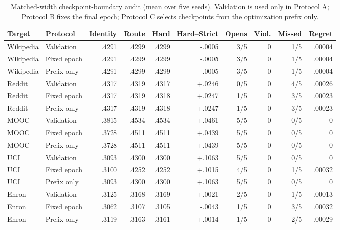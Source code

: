 \documentclass[journal]{IEEEtran}
\begin{document}
\begin{table}[t]
\centering
\caption{Matched-width checkpoint-boundary audit (mean over five seeds). Validation is used only in Protocol A; Protocol B fixes the final epoch; Protocol C selects checkpoints from the optimization prefix only.}
\label{tab:checkpoint_boundary}
\scriptsize
\setlength{\tabcolsep}{2.8pt}
\begin{tabular}{llrrrrrrrr}
\toprule
\textbf{Target} & \textbf{Protocol} & \textbf{Identity} & \textbf{Route} & \textbf{Hard} & \textbf{Hard--Strict} & \textbf{Opens} & \textbf{Viol.} & \textbf{Missed} & \textbf{Regret} \\
\midrule
Wikipedia & Validation & .4291 & .4299 & .4299 & -.0005 & 3/5 & 0 & 1/5 & .00004 \\
Wikipedia & Fixed epoch & .4291 & .4299 & .4299 & -.0005 & 3/5 & 0 & 1/5 & .00004 \\
Wikipedia & Prefix only & .4291 & .4299 & .4299 & -.0005 & 3/5 & 0 & 1/5 & .00004 \\
Reddit & Validation & .4317 & .4319 & .4317 & +.0246 & 0/5 & 0 & 4/5 & .00026 \\
Reddit & Fixed epoch & .4317 & .4319 & .4318 & +.0247 & 1/5 & 0 & 3/5 & .00023 \\
Reddit & Prefix only & .4317 & .4319 & .4318 & +.0247 & 1/5 & 0 & 3/5 & .00023 \\
MOOC & Validation & .3815 & .4534 & .4534 & +.0461 & 5/5 & 0 & 0/5 & 0 \\
MOOC & Fixed epoch & .3728 & .4511 & .4511 & +.0439 & 5/5 & 0 & 0/5 & 0 \\
MOOC & Prefix only & .3728 & .4511 & .4511 & +.0439 & 5/5 & 0 & 0/5 & 0 \\
UCI & Validation & .3093 & .4300 & .4300 & +.1063 & 5/5 & 0 & 0/5 & 0 \\
UCI & Fixed epoch & .3100 & .4252 & .4252 & +.1015 & 4/5 & 0 & 1/5 & .00032 \\
UCI & Prefix only & .3093 & .4300 & .4300 & +.1063 & 5/5 & 0 & 0/5 & 0 \\
Enron & Validation & .3125 & .3168 & .3169 & +.0021 & 2/5 & 0 & 1/5 & .00013 \\
Enron & Fixed epoch & .3062 & .3107 & .3105 & -.0043 & 1/5 & 0 & 3/5 & .00032 \\
Enron & Prefix only & .3119 & .3163 & .3161 & +.0014 & 1/5 & 0 & 2/5 & .00029 \\
\bottomrule
\end{tabular}
\end{table}
\end{document}
